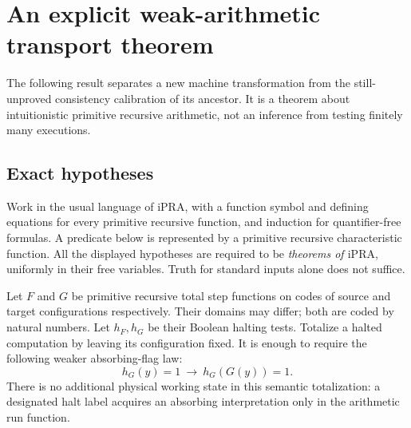\section{An explicit weak-arithmetic transport theorem}
\label{sec:ipra-transport}

The following result separates a new machine transformation from the
still-unproved consistency calibration of its ancestor. It is a theorem
about intuitionistic primitive recursive arithmetic, not an inference from
testing finitely many executions.

\subsection{Exact hypotheses}

Work in the usual language of $\mathrm{iPRA}$, with a function symbol and
defining equations for every primitive recursive function, and induction
for quantifier-free formulas. A predicate below is represented by a
primitive recursive characteristic function. All the displayed hypotheses
are required to be \emph{theorems of $\mathrm{iPRA}$}, uniformly in their
free variables. Truth for standard inputs alone does not suffice.

Let $F$ and $G$ be primitive recursive total step functions on codes of
source and target configurations respectively. Their domains may differ;
both are coded by natural numbers. Let $h_F,h_G$ be their Boolean halting
tests. Totalize a halted computation by leaving its configuration fixed.
It is enough to require the following weaker absorbing-flag law:
\[
 h_G(y)=1\ \longrightarrow\ h_G(G(y))=1.                 \tag{A}
\]
There is no additional physical working state in this semantic
totalization: a designated halt label acquires an absorbing interpretation
only in the arithmetic run function.

